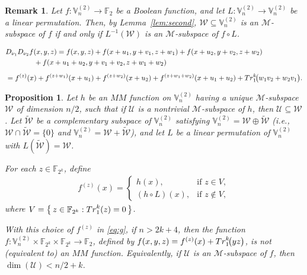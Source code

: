 \documentclass[10pt,a4paper]{amsart}
\newtheorem{remark}{Remark}
\newtheorem{proposition}{Proposition}
\newcommand{\F}{\mathbb{F}}
\newcommand{\Tr}{{\rm Tr}}
\newcommand{\V}{\mathbb{V}}
\renewcommand{\to}{\rightarrow}
\begin{document}
	\begin{remark}\label{rem:fcircL}
		Let \(f \colon \V_n^{(2)} \to \F_2\) be a Boolean function, and let
		\(L \colon \V_n^{(2)} \to \V_n^{(2)}\) be a linear permutation. Then, by Lemma~\ref{lem:second},
		\(\mathcal{W} \subseteq \V_n^{(2)}\) is an \(\mathcal{M}\)-subspace of \(f\) if and only if
		\(L^{-1}(\mathcal{W})\) is an \(\mathcal{M}\)-subspace of \(f \circ L\).
	\end{remark}

	\begin{align}\label{eq:secondder}
		&D_{\nu_1}D_{\nu_2}f(x,y,z)
		= f(x,y,z)
		+ f(x+u_1,y+v_1,z+w_1)
		+ f(x+u_2,y+v_2,z+w_2)\\ \nonumber
		&\qquad\qquad 
		+ f(x+u_1+u_2,y+v_1+v_2,z+w_1+w_2)\\[0.5em] \nonumber
		&=f^{(z)}(x)
		+ f^{(z+w_1)}(x+u_1)
		+f^{(z+w_2)}(x+u_2)
		+ f^{(z+w_1+w_2)}(x+u_1+u_2)
		+ \Tr_1^k\!\bigl(w_1v_2+w_2v_1\bigr).
	\end{align}

	\begin{proposition}\label{thm:main}
		Let \(h\) be an \(MM\) function on \(\V_n^{(2)}\) 
		having a unique 
		\(\mathcal{M}\)-subspace \(\mathcal{W}\) of dimension \(n/2\), such that if $\mathcal{U}$ is a nontrivial
		\(\mathcal{M}\)-subspace of $h$, then $\mathcal{U}\subseteq \mathcal{W}$. Let  \(\widetilde{\mathcal{W}}\) be a complementary subspace of \(\V_n^{(2)}\) satisfying 
		\(\V_n^{(2)} =\mathcal{W} \oplus \widetilde{\mathcal{W}}\) (i.e., $\mathcal{W} \cap \widetilde{\mathcal{W}}=\{0\}$ and \(\V_n^{(2)} =\mathcal{W} + \widetilde{\mathcal{W}}\)), and let \(L\) be a linear permutation of \(\V_n^{(2)}\) with 
		\({L}( \widetilde{\mathcal{W}} ) = \mathcal{W}\).
		
		For each \(z\in\mathbb{F}_{2^k}\), define  
		\begin{align}\label{eq:g}
			f^{(z)}(x) =
			\begin{cases}
				h(x), & \text{if } z \in V,\\[6pt]
				(h\circ L)(x), & \text{if } z \not\in V,
			\end{cases}
		\end{align}
		where $	V = \bigl\{\, z \in \mathbb{F}_{2^k} : \Tr_1^k(z)=0 \,\bigr\}$.
		
		With this choice of \(f^{(z)}\) in \eqref{eq:g}, if \(n > 2k+4\), 
		then the function $	f:\V_n^{(2)} \times \mathbb{F}_{2^k} \times \mathbb{F}_{2^k} \to \mathbb{F}_{2}$, defined by $f(x,y,z) = f^{(z)}(x) + \Tr_1^k\!\bigl(y z\bigr)$, is not (equivalent to) an \(MM\) function. 
		Equivalently, if \(\mathcal{U}\) is an \(\mathcal{M}\)-subspace of \(f\), then 
		\(\dim(\mathcal{U}) < n/2 + k\).
	\end{proposition}
\end{document}
